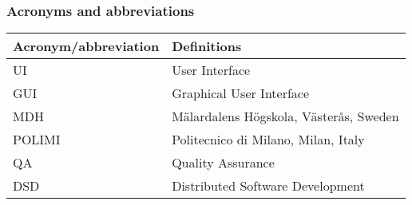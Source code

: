 \subsubsection{Acronyms and abbreviations}
\begin{center}
	\begin{tabular} { | m{5cm} | m{8cm} | }
		\hline
		\textbf{Acronym/abbreviation} & \textbf{Definitions}\\
		\hline
		UI & User Interface\\
		\hline
		GUI & Graphical User Interface\\
		\hline
		MDH & Mälardalens Högskola, Västerås, Sweden\\
		\hline
		POLIMI & Politecnico di Milano, Milan, Italy\\
		\hline
		QA & Quality Assurance\\
		\hline
		DSD & Distributed Software Development\\
		\hline
	\end{tabular}
\end{center}